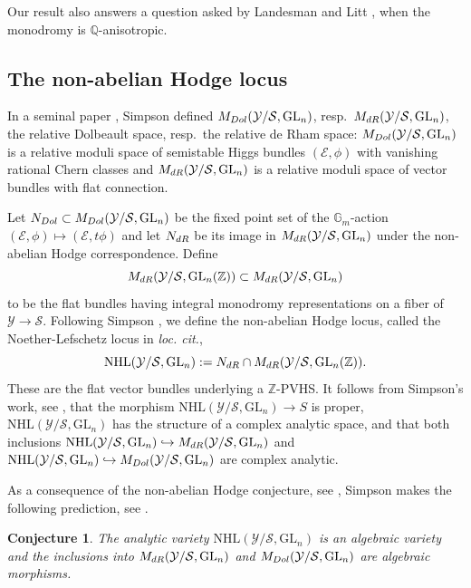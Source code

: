 \documentclass[10pt,letterpaper,english,reqno]{amsart}
\numberwithin{equation}{subsection}
\newcommand\cE{{\mathcal E}}
\newcommand\cS{{\mathcal S}}
\newcommand\cY{{\mathcal Y}}
\newcommand\Q{{\mathbb Q}}
\newcommand\Z{{\mathbb Z}}
\DeclareMathOperator{\GL}{GL}
\newtheorem{conjecture}[theorem]{Conjecture}
\theoremstyle{definition}
\begin{document}
Our result also answers a question asked by Landesman and Litt \cite[Question 8.2.1]{landesman-litt}, when the monodromy is $\Q$-anisotropic. 

\subsection{The non-abelian Hodge locus}
In a seminal paper \cite{simpson-moduli-2}, Simpson defined 
$M_{\rm Dol}(\cY/\cS,\mathrm{GL}_n)$, resp.~$M_{\rm dR}(\cY/\cS,\mathrm{GL}_n)$, the relative Dolbeault space,
resp.~the relative de Rham space: 
$M_{\rm Dol}(\cY/\cS,\mathrm{GL}_n)$ is a relative moduli space
of semistable Higgs bundles $(\cE,\phi)$ with vanishing rational Chern classes and $M_{\rm dR}(\cY/\cS,\mathrm{GL}_n)$ is a relative moduli space of vector bundles with flat connection.

Let $N_{\rm Dol} \subset M_{\rm Dol}(\cY/\cS,\mathrm{GL}_n)$ be the fixed point set of the $\mathbb G_m$-action $(\cE,\phi)\mapsto (\cE,t\phi)$ and let $N_{\rm dR}$ be its image in $M_{\rm dR}(\cY/\cS,\mathrm{GL}_n)$ under the non-abelian Hodge correspondence.
Define $$M_{\rm dR}(\cY/\cS,\mathrm{GL}_n(\Z))\subset M_{\rm dR}(\cY/\cS,\mathrm{GL}_n)$$ to be the flat bundles having integral monodromy representations on a fiber of $\cY\rightarrow \cS$. Following Simpson \cite[\S 12]{simpson}, we define the non-abelian Hodge locus, called the Noether-Lefschetz locus in {\it loc. cit.}, 
 \[\mathrm{NHL}(\cY/\cS,\mathrm{GL}_n):=N_{\rm dR}\cap M_{\rm dR}(\cY/\cS,\mathrm{GL}_n(\Z)).\]  
 These are the flat vector bundles underlying a $\Z$-PVHS. It follows from Simpson's work, see \cite[Theorem 12.1]{simpson}, that the morphism $\mathrm{NHL}(\cY/\cS,\mathrm{GL}_n)\rightarrow S$ is proper, $\mathrm{NHL}(\cY/\cS,\mathrm{GL}_n)$ has the structure of a complex analytic space, and that both inclusions $\mathrm{NHL}(\cY/\cS,\mathrm{GL}_n)\hookrightarrow M_{\rm dR}(\cY/\mathcal S,\GL_n)$ and $\mathrm{NHL}(\cY/\cS,\mathrm{GL}_n)\hookrightarrow M_{\rm Dol}(\cY/\cS,\GL_n)$ are complex analytic. 
 
 As a consequence of the non-abelian Hodge conjecture, see \cite[Conjecture 12.4]{simpson}, Simpson makes the following prediction, see \cite[Conjecture 12.3]{simpson}. 
\begin{conjecture}\label{conjecture}
The analytic variety $\mathrm{NHL}(\cY/\cS,\mathrm{GL}_n)$ is an algebraic variety and the inclusions into $M_{\rm dR}(\cY/\mathcal S,\GL_n)$ and $M_{\rm Dol}(\cY/\cS,\GL_n)$ are algebraic morphisms.  
\end{conjecture}
\end{document}
